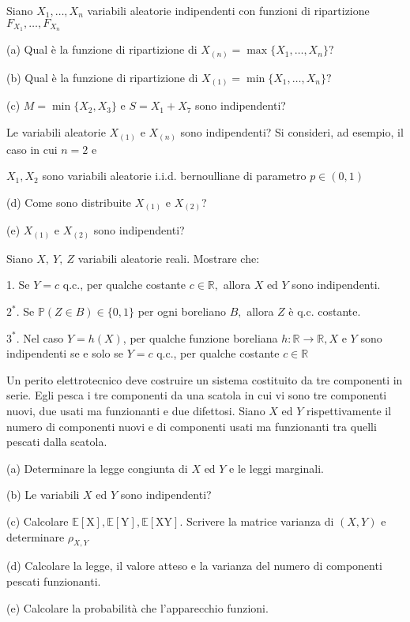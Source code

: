Siano $X_{1} ,\dotsc ,X_{n}$ variabili aleatorie indipendenti con funzioni di ripartizione $F_{X_{1}} ,\dotsc ,F_{X_{n}}$

(a) Qual è la funzione di ripartizione di $X_{(n)} =\max\{X_{1} ,\dotsc ,X_{n}\} ?$

(b) Qual è la funzione di ripartizione di $X_{(1)} =\min\{X_{1} ,\dotsc ,X_{n}\} ?$

(c) $M=\min\{X_{2} ,X_{3}\}$ e $S=X_{1} +X_{7}$ sono indipendenti?

Le variabili aleatorie $X_{(1)}$ e $X_{(n)}$ sono indipendenti? Si consideri, ad esempio, il caso in cui $n=2$ e

$X_{1} ,X_{2}$ sono variabili aleatorie i.i.d. bernoulliane di parametro $p\in (0,1)$

(d) Come sono distribuite $X_{(1)}$ e $X_{(2)}$?

(e) $X_{(1)}$ e $X_{(2)}$ sono indipendenti?
\Esercizio{}

Siano $X,\ Y,\ Z$ variabili aleatorie reali. Mostrare che:

1. Se $Y=c$ q.c., per qualche costante $c\in \mathbb{R} ,$ allora $X$ ed $Y$ sono indipendenti.

$2^{*} .$ Se $\mathbb{P} (Z\in B)\in \{0,1\}$ per ogni boreliano $B,$ allora $Z$ è q.c. costante.

$3^{*} .$ Nel caso $Y=h(X)$, per qualche funzione boreliana $h:\mathbb{R}\rightarrow \mathbb{R} ,X$ e $Y$ sono indipendenti se e solo se $Y=c$ q.c., per qualche costante $c\in \mathbb{R}$
\Esercizio{}

Un perito elettrotecnico deve costruire un sistema costituito da tre componenti in serie. Egli pesca i tre componenti da una scatola in cui vi sono tre componenti nuovi, due usati ma funzionanti e due difettosi. Siano $X$ ed $Y$ rispettivamente il numero di componenti nuovi e di componenti usati ma funzionanti tra quelli pescati dalla scatola.

(a) Determinare la legge congiunta di $X$ ed $Y$ e le leggi marginali.

(b) Le variabili $X$ ed $Y$ sono indipendenti?

(c) Calcolare $\mathbb{E} [\mathrm{X} ],\mathbb{E} [\mathrm{Y} ],\mathbb{E} [\mathrm{XY} ].$ Scrivere la matrice varianza di $(X,Y)$ e determinare $\rho _{X,Y}$

(d) Calcolare la legge, il valore atteso e la varianza del numero di componenti pescati funzionanti.

(e) Calcolare la probabilità che l'apparecchio funzioni.
\Esercizio{}

